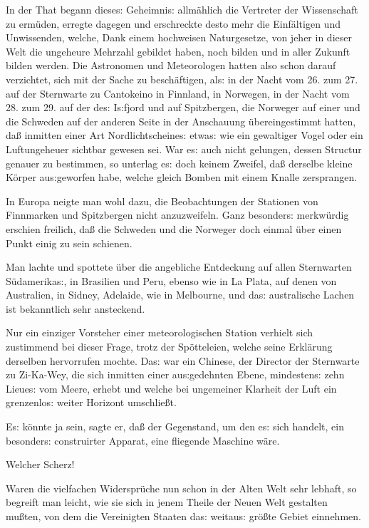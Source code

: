 \documentclass[oneside,12pt]{book}
\newcommand{\s}{s:}
\begin{document}
In der That begann diese{\s} Geheimni{\s} allm\"ahlich die Vertreter
der Wissenschaft zu erm\"uden, erregte dagegen und erschreckte desto
mehr die Einf\"altigen und Unwissenden, welche, Dank einem hochweisen
Naturgesetze, von jeher in dieser Welt die ungeheure Mehrzahl
gebildet haben, noch bilden und in aller Zukunft bilden werden. Die
Astronomen und Meteorologen hatten also schon darauf verzichtet, sich
mit der Sache zu besch\"aftigen, al{\s} in der Nacht vom 26. zum 27.
auf der Sternwarte zu Cantokeino in Finnland, in Norwegen, in der
Nacht vom 28. zum 29. auf der de{\s} I{\s}fjord und auf Spitzbergen,
die Norweger auf einer und die Schweden auf der anderen Seite in der
Anschauung \"ubereingestimmt hatten, da{\ss} inmitten einer Art
Nordlichtscheine{\s} etwa{\s} wie ein gewaltiger Vogel oder ein
Luftungeheuer sichtbar gewesen sei. War e{\s} auch nicht gelungen,
dessen Structur genauer zu bestimmen, so unterlag e{\s} doch keinem
Zweifel, da{\ss} derselbe kleine K\"orper au{\s}geworfen habe, welche
gleich Bomben mit einem Knalle zersprangen.

In Europa neigte man wohl dazu, die Beobachtungen der Stationen von
Finnmarken und Spitzbergen nicht anzuzweifeln. Ganz besonder{\s}
merkw\"urdig erschien freilich, da{\ss} die Schweden und die Norweger
doch einmal \"uber einen Punkt einig zu sein schienen.

Man lachte und spottete \"uber die angebliche Entdeckung auf allen
Sternwarten S\"udamerika{\s}, in Brasilien und Peru, ebenso wie in La
Plata, auf denen von Australien, in Sidney, Adelaide, wie in
Melbourne, und da{\s} australische Lachen ist bekanntlich sehr
ansteckend.

Nur ein einziger Vorsteher einer meteorologischen Station verhielt
sich zustimmend bei dieser Frage, trotz der Sp\"otteleien, welche
seine Erkl\"arung derselben hervorrufen mochte. Da{\s} war ein
Chinese, der Director der Sternwarte zu Zi-Ka-Wey, die sich inmitten
einer au{\s}gedehnten Ebene, mindesten{\s} zehn Lieue{\s} vom Meere,
erhebt und welche bei ungemeiner Klarheit der Luft ein grenzenlo{\s}
weiter Horizont umschlie{\ss}t.

{\glqq}E{\s} k\"onnte ja sein, sagte er, da{\ss} der Gegenstand, um
den e{\s} sich handelt, ein besonder{\s} construirter Apparat, eine
fliegende Maschine w\"are.{\grqq}

Welcher Scherz!

Waren die vielfachen Widerspr\"uche nun schon in der Alten Welt sehr
lebhaft, so begreift man leicht, wie sie sich in jenem Theile der
Neuen Welt gestalten mu{\ss}ten, von dem die Vereinigten Staaten
da{\s} weitau{\s} gr\"o{\ss}te Gebiet einnehmen.
\end{document}
